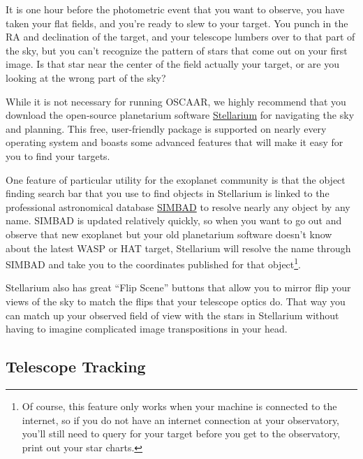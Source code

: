 \documentclass[a4paper]{article}
\begin{document}
It is one hour before the photometric event that you want to observe, you have taken your flat fields, and you're ready to slew to your target. You punch in the RA and declination of the target, and your telescope lumbers over to that part of the sky, but you can't recognize the pattern of stars that come out on your first image. Is that star near the center of the field actually your target, or are you looking at the wrong part of the sky? 

While it is not necessary for running OSCAAR, we highly recommend that you download the open-source planetarium software \href{http://www.stellarium.org/}{Stellarium} for navigating the sky and planning. This free, user-friendly package is supported on nearly every operating system and boasts some advanced features that will make it easy for you to find your targets. 

One feature of particular utility for the exoplanet community is that the object finding search bar that you use to find objects in Stellarium is linked to the professional astronomical database \href{http://simbad.harvard.edu/simbad/}{SIMBAD} to resolve nearly any object by any name. SIMBAD is updated relatively quickly, so when you want to go out and observe that new exoplanet but your old planetarium software doesn't know about the latest WASP or HAT target, Stellarium will resolve the name through SIMBAD and take you to the coordinates published for that object\footnote{Of course, this feature only works when your machine is connected to the internet, so if you do not have an internet connection at your observatory, you'll still need to query for your target before you get to the observatory, print out your star charts.}.

Stellarium also has great ``Flip Scene'' buttons that allow you to mirror flip your views of the sky to match the flips that your telescope optics do. That way you can match up your observed field of view with the stars in Stellarium without having to imagine complicated image transpositions in your head.

\subsection{Telescope Tracking}
\end{document}
